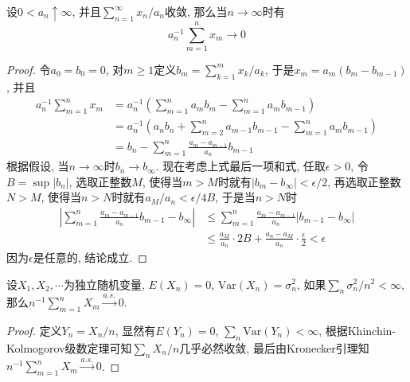 \documentclass[cn, 12pt, math=mtpro2, bibstyle=apa, blue, twocol]{elegantbook}
\begin{document}
\begin{theorem}[Kronecker引理]
  设$0<a_n\uparrow \infty$, 并且$\sum_{n=1}^{\infty}x_n/a_n$收敛, 那么当$n\to\infty$时有
  $$a_n^{-1}\sum_{m=1}^{n}x_m\to 0$$
\end{theorem}
  \begin{proof}
  令$a_0=b_0=0$, 对$m\ge1$定义$b_m=\sum_{k=1}^{m}x_k/a_k$, 于是$x_m=a_m(b_m-b_{m-1})$, 并且
  \begin{align*}
  a_n^{-1}\sum_{m=1}^{n}x_m&=a_n^{-1}\left(\sum_{m=1}^{n}a_mb_m-\sum_{m=1}^{n}a_mb_{m-1}\right) \\
  &=a_n^{-1}\left(a_nb_n+\sum_{m=2}^{n}a_{m-1}b_{m-1}-\sum_{m=1}^{n}a_mb_{m-1}\right) \\
  &=b_n-\sum_{m=1}^{n}\frac{a_m-a_{m-1}}{a_n}b_{m-1}
  \end{align*}
  根据假设, 当$n\to\infty$时$b_n\to b_{\infty}$. 现在考虑上式最后一项和式, 任取$\epsilon>0$, 令$B=\sup|b_n|$, 选取正整数$M$, 使得当$m>M$时就有$|b_m-b_\infty|<\epsilon/2$, 再选取正整数$N>M$, 使得当$n>N$时就有$a_M/a_n<\epsilon/4B$, 于是当$n>N$时
  \begin{align*}
  \left|\sum_{m=1}^{n}\frac{a_m-a_{m-1}}{a_n}b_{m-1}-b_\infty\right|&\leq\sum_{m=1}^{n}\frac{a_m-a_{m-1}}{a_n}|b_{m-1}-b_\infty| \\
  &\leq\frac{a_M}{a_n}\cdot 2B+\frac{a_n-a_M}{a_n}\cdot\frac{\epsilon}{2}<\epsilon
  \end{align*}
  因为$\epsilon$是任意的, 结论成立.
\end{proof}
\begin{example}
设$X_1,X_2,\cdots$为独立随机变量, $E(X_n)=0$, $\text{Var}(X_n)=\sigma_n^2$, 如果$\sum_n \sigma_n^2/n^2<\infty$, 那么$n^{-1}\sum_{m=1}^{n}X_m\xrightarrow{a.s.}0$.
\end{example}
\begin{proof}
  定义$Y_n=X_n/n$, 显然有$E(Y_n)=0$, $\sum_n\text{Var}(Y_n)<\infty$, 根据Khinchin-Kolmogorov级数定理可知$\sum_n X_n/n$几乎必然收敛, 最后由Kronecker引理知$n^{-1}\sum_{m=1}^{n}X_m\xrightarrow{a.s.}0$.
\end{proof}
\end{document}
